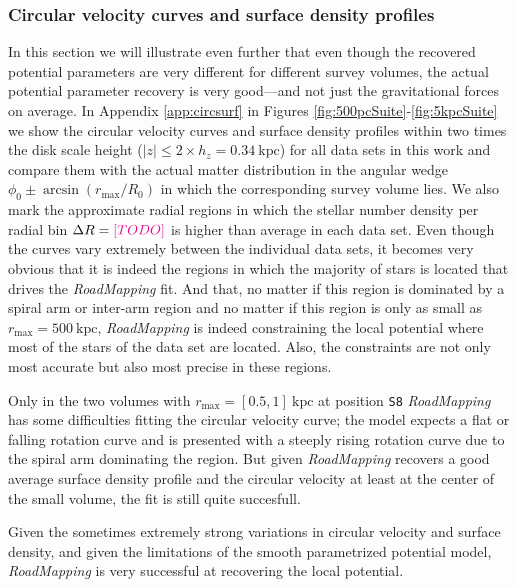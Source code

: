 \documentclass[iop,revtex4,numberedappendix,appendixfloats]{emulateapj}
\newcommand{\RM}{{\sl RoadMapping}}
\newcommand{\Wilma}[1]{\textcolor{Magenta}{#1}}
\begin{document}
\subsubsection{Circular velocity curves and surface density profiles} \label{sec:circvel_surfdens}

In this section we will illustrate even further that even though the recovered potential parameters are very different for different survey volumes, the actual potential parameter recovery is very good---and not just the gravitational forces on average. In Appendix \ref{app:circsurf} in Figures \ref{fig:500pcSuite}-\ref{fig:5kpcSuite} we show the circular velocity curves and surface density profiles within two times the disk scale height ($|z|\leq 2 \times h_z = 0.34~\text{kpc}$) for all data sets in this work and compare them with the actual matter distribution in the angular wedge $\phi_0\pm \arcsin(r_\text{max}/R_0)$ in which the corresponding survey volume lies. We also mark the approximate radial regions in which the stellar number density per radial bin $\Delta R =\Wilma{[TO DO]}$ is higher than average in each data set. Even though the curves vary extremely between the individual data sets, it becomes very obvious that it is indeed the regions in which the majority of stars is located that drives the \RM{} fit. And that, no matter if this region is dominated by a spiral arm or inter-arm region and no matter if this region is only as small as $r_\text{max}=500~\text{kpc}$, \RM{} is indeed constraining the local potential where most of the stars of the data set are located. Also, the constraints are not only most accurate but also most precise in these regions.

Only in the two volumes with $r_\text{max}=[0.5,1]~\text{kpc}$ at position \texttt{S8} \RM{} has some difficulties fitting the circular velocity curve; the model expects a flat or falling rotation curve and is presented with a steeply rising rotation curve due to the spiral arm dominating the region. But given \RM{} recovers a good average surface density profile and the circular velocity at least at the center of the small volume, the fit is still quite succesfull.

Given the sometimes extremely strong variations in circular velocity and surface density, and given the limitations of the smooth parametrized potential model, \RM{} is very successful at recovering the local potential.

\end{document}
